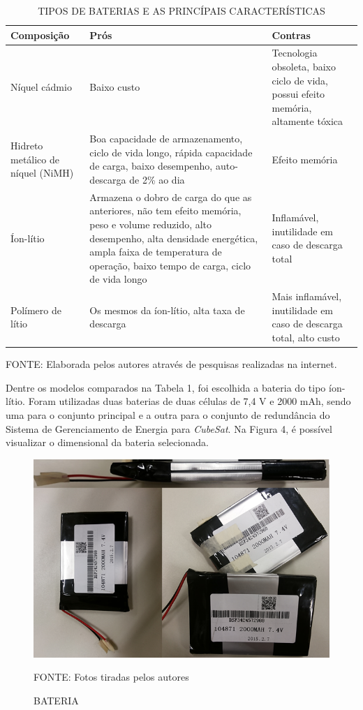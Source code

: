\documentclass[
	12pt,				%
	openright,			%
	oneside,			%
	a4paper,			%
	english,			%
	french,				%
	spanish,			%
	brazil,				%
	oldfontcommands
	]{abntex2}
\begin{document}
	\begin{table}[th]
	\caption{TIPOS DE BATERIAS E AS PRINCÍPAIS CARACTERÍSTICAS}
	\begin{tabular}{p{4cm}|p{6cm}|p{5cm}}
	\textbf{Composição} & \textbf{Prós} & \textbf{Contras}\\
	\hline
	Níquel cádmio & Baixo custo & Tecnologia obsoleta, baixo ciclo de vida, possui efeito memória, altamente tóxica\\
	\hline
	Hidreto metálico de níquel (NiMH) &	Boa capacidade de armazenamento, ciclo de vida longo, rápida capacidade de carga, baixo desempenho, auto-descarga de 2\% ao dia & Efeito memória\\
	\hline
	Íon-lítio & Armazena o dobro de carga do que as anteriores, não tem efeito memória, peso e volume reduzido, alto desempenho, alta densidade energética, ampla faixa de temperatura de operação, baixo tempo de carga, ciclo de vida longo & Inflamável, inutilidade em caso de descarga total\\
	\hline
	Polímero de lítio & Os mesmos da íon-lítio, alta taxa de descarga & Mais inflamável, inutilidade em caso de descarga total, alto custo\\	
	\hline
	\end{tabular}
	
	\begin{small}
	\vspace{3pt}
		FONTE: Elaborada pelos autores através de pesquisas realizadas na internet.
	\end{small}
	\end{table}
		
	Dentre os modelos comparados na Tabela 1, foi escolhida a bateria do tipo íon-lítio. Foram utilizadas duas baterias de duas células de 7,4 V e 2000 mAh, sendo uma para o conjunto principal e a outra para o conjunto de redundância do Sistema de Gerenciamento de Energia para \textit{CubeSat}. Na Figura 4, é possível visualizar o dimensional da bateria selecionada.
	
	\begin{figure}[th]
		\caption{BATERIA}
		\centering
		\includegraphics[width=0.6\linewidth]{./figs/cubesat_04}
			
		\begin{small}
			FONTE: Fotos tiradas pelos autores
		\end{small}
	\end{figure}
	
\end{document}
